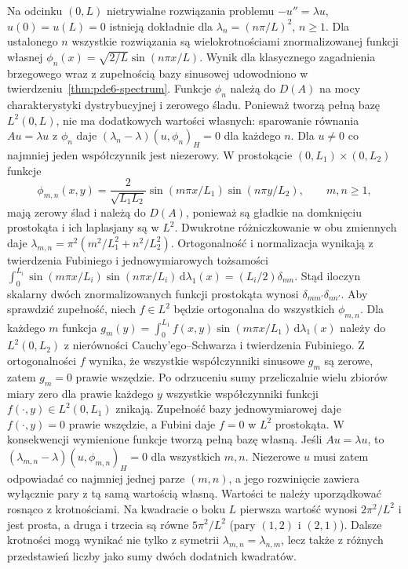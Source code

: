\begin{przyklad}
Na odcinku $(0,L)$ nietrywialne rozwiązania problemu
$-u''=\lambda u$, $u(0)=u(L)=0$ istnieją dokładnie
dla $\lambda_n=(n\pi/L)^2$, $n\ge1$.
Dla ustalonego $n$ wszystkie rozwiązania są wielokrotnościami
znormalizowanej funkcji własnej
$\phi_n(x)=\sqrt{2/L}\sin(n\pi x/L)$.
Wynik dla klasycznego zagadnienia brzegowego wraz
z zupełnością bazy sinusowej udowodniono
w twierdzeniu~\ref{thm:pde6-spectrum}.
Funkcje $\phi_n$ należą do $D(A)$ na mocy charakterystyki
dystrybucyjnej i zerowego śladu. Ponieważ tworzą pełną
bazę $L^2(0,L)$, nie ma dodatkowych wartości własnych:
sparowanie równania $Au=\lambda u$ z $\phi_n$ daje
$(\lambda_n-\lambda)(u,\phi_n)_H=0$ dla każdego $n$.
Dla $u\ne0$ co najmniej jeden współczynnik jest niezerowy.
W prostokącie $(0,L_1)\times(0,L_2)$ funkcje
\[
 \phi_{m,n}(x,y)=\frac{2}{\sqrt{L_1L_2}}
 \sin(m\pi x/L_1)\sin(n\pi y/L_2),\qquad m,n\ge1,
\]
mają zerowy ślad i należą do $D(A)$, ponieważ są
gładkie na domknięciu prostokąta i ich laplasjany są
w $L^2$. Dwukrotne różniczkowanie w obu zmiennych daje
$\lambda_{m,n}=\pi^2(m^2/L_1^2+n^2/L_2^2)$.
Ortogonalność i normalizacja wynikają z twierdzenia
Fubiniego i jednowymiarowych tożsamości
$\int_0^{L_i}\sin(m\pi x/L_i)\sin(n\pi x/L_i)
\,\mathrm d\lambda_1(x)=(L_i/2)\delta_{mn}$.
Stąd iloczyn skalarny dwóch znormalizowanych funkcji
prostokąta wynosi $\delta_{mm'}\delta_{nn'}$. Aby sprawdzić zupełność,
niech $f\in L^2$ będzie ortogonalna do wszystkich
$\phi_{m,n}$. Dla każdego $m$ funkcja
$g_m(y)=\int_0^{L_1} f(x,y)\sin(m\pi x/L_1)\,
\mathrm d\lambda_1(x)$ należy do $L^2(0,L_2)$
z nierówności Cauchy'ego--Schwarza i twierdzenia Fubiniego.
Z ortogonalności $f$ wynika, że wszystkie współczynniki
sinusowe $g_m$ są zerowe, zatem $g_m=0$ prawie wszędzie.
Po odrzuceniu sumy przeliczalnie wielu zbiorów miary zero
dla prawie każdego $y$ wszystkie współczynniki funkcji
$f(\cdot,y)\in L^2(0,L_1)$ znikają. Zupełność bazy
jednowymiarowej daje $f(\cdot,y)=0$ prawie wszędzie,
a Fubini daje $f=0$ w $L^2$ prostokąta.
W konsekwencji wymienione funkcje tworzą pełną bazę własną.
Jeśli $Au=\lambda u$, to
$(\lambda_{m,n}-\lambda)(u,\phi_{m,n})_H=0$
dla wszystkich $m,n$. Niezerowe $u$ musi zatem
odpowiadać co najmniej jednej parze $(m,n)$,
a jego rozwinięcie zawiera wyłącznie pary z tą samą
wartością własną. Wartości te należy uporządkować
rosnąco z krotnościami.
Na kwadracie o boku $L$ pierwsza wartość wynosi
$2\pi^2/L^2$ i jest prosta, a druga i trzecia są równe
$5\pi^2/L^2$ (pary $(1,2)$ i $(2,1)$).
Dalsze krotności mogą wynikać nie tylko z symetrii
$\lambda_{m,n}=\lambda_{n,m}$, lecz także z różnych
przedstawień liczby jako sumy dwóch dodatnich kwadratów.
\end{przyklad}

